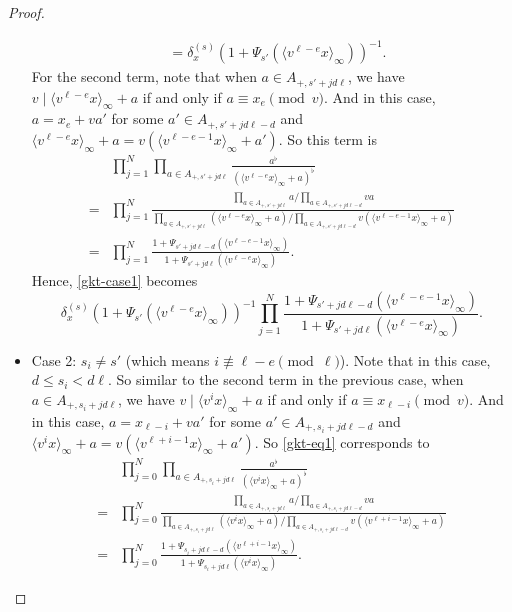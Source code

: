 \documentclass[11pt]{amsart}
\theoremstyle{plain}
\theoremstyle{definition}
\theoremstyle{remark}
\numberwithin{equation}{section}
\newcommand{\anginf}[1]{\langle #1 \rangle_\infty}
\let\l\ell
\begin{document}
\begin{proof}
\begin{itemize}
\begin{align*}
				&= \delta_x^{(s)} \left(1+ \Psi_{s'}\left(\anginf{v^{\l-e} x}\right)\right)^{-1}.
			\end{align*}
			For the second term, note that when $a \in A_{+,s'+jd\l}$, we have $v \mid \anginf{v^{\l-e} x} + a$ if and only if $a \equiv x_e \pmod{v}$.
			And in this case, $a = x_e + va'$ for some $a' \in A_{+,s'+jd\l-d}$ and $\anginf{v^{\l-e}x} + a = v(\anginf{v^{\l-e-1}x} + a')$.
			So this term is
			\begin{align*}
				&\prod_{j=1}^N \prod_{a \in A_{+,s'+jd\l}} \frac{a^\flat}{\left(\anginf{v^{\l-e}x}+a\right)^\flat}   \\
				={} &\prod_{j=1}^N \frac{ \prod_{a\in A_{+,s'+jd\l}} a \Big/ \prod_{a\in A_{+,s'+jd\l-d}} va }{ \prod_{a\in A_{+,s'+jd\l}} \left(\anginf{v^{\l-e}x}+a\right) \Big/ \prod_{a\in A_{+,s'+jd\l-d}} v\left(\anginf{v^{\l-e-1}x} + a\right) }      \\
				={} &\prod_{j=1}^N \frac{1+\Psi_{s'+jd\l-d} \left(\anginf{v^{\l-e-1}x}\right)}{1+\Psi_{s'+jd\l} \left(\anginf{v^{\l-e}x}\right)}.
			\end{align*}
			Hence, \eqref{gkt-case1} becomes
			$$
			\delta_x^{(s)} \left(1+ \Psi_{s'}\left(\anginf{v^{\l-e}x}\right)\right)^{-1}
			\prod_{j=1}^N \frac{1+\Psi_{s'+jd\l-d} \left(\anginf{v^{\l-e-1}x}\right)}{1+\Psi_{s'+jd\l} \left(\anginf{v^{\l-e}x}\right)}.
			$$
			
			\item Case 2:
			$s_i \neq s'$ (which means $i \not\equiv \l-e \pmod{\l}$).
			Note that in this case, $d\leq s_i < d\l$.
			So similar to the second term in the previous case, when $a \in A_{+,s_i+jd\l}$, we have $v \mid \anginf{v^ix} + a$ if and only if $a \equiv x_{\l-i} \pmod{v}$.
			And in this case, $a = x_{\l-i} + va'$ for some $a' \in A_{+,s_i+jd\l-d}$ and $\anginf{v^ix} + a = v(\anginf{v^{\l+i-1}x} + a')$.
			So \eqref{gkt-eq1} corresponds to
			\begin{align*}
				&\prod_{j=0}^N \prod_{a \in A_{+,s_i+jd\l}} \frac{a^\flat}{\left(\anginf{v^ix}+a\right)^\flat}   \\
				={} &\prod_{j=0}^N \frac{ \prod_{a\in A_{+,s_i+jd\l}} a \Big/ \prod_{a\in A_{+,s_i+jd\l-d}} va }{ \prod_{a\in A_{+,s_i+jd\l}} \left(\anginf{v^ix}+a\right) \Big/ \prod_{a\in A_{+,s_i+jd\l-d}} v \left(\anginf{v^{\l+i-1}x} + a\right) }      \\
				={} &\prod_{j=0}^N \frac{1+\Psi_{s_i+jd\l-d} \left(\anginf{v^{\l+i-1}x}\right)}{1+\Psi_{s_i+jd\l} \left(\anginf{v^ix}\right)}.   
			\end{align*}
		\end{itemize}
		

\end{proof}
\end{document}
